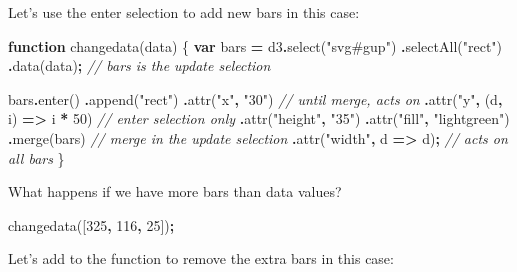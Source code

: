\documentclass[
  openany]{book}
\newenvironment{Shaded}{\begin{snugshade}}{\end{snugshade}}
\newcommand{\CommentTok}[1]{\textcolor[rgb]{0.56,0.35,0.01}{\textit{#1}}}
\newcommand{\DecValTok}[1]{\textcolor[rgb]{0.00,0.00,0.81}{#1}}
\newcommand{\FunctionTok}[1]{\textcolor[rgb]{0.00,0.00,0.00}{#1}}
\newcommand{\KeywordTok}[1]{\textcolor[rgb]{0.13,0.29,0.53}{\textbf{#1}}}
\newcommand{\NormalTok}[1]{#1}
\newcommand{\OperatorTok}[1]{\textcolor[rgb]{0.81,0.36,0.00}{\textbf{#1}}}
\newcommand{\StringTok}[1]{\textcolor[rgb]{0.31,0.60,0.02}{#1}}
\begin{document}
Let's use the enter selection to add new bars in this case:

\begin{Shaded}
\begin{Highlighting}[]
\KeywordTok{function} \FunctionTok{changedata}\NormalTok{(data) \{}
  \KeywordTok{var}\NormalTok{ bars }\OperatorTok{=}\NormalTok{ d3}\OperatorTok{.}\FunctionTok{select}\NormalTok{(}\StringTok{"svg\#gup"}\NormalTok{) }
    \OperatorTok{.}\FunctionTok{selectAll}\NormalTok{(}\StringTok{"rect"}\NormalTok{)}
    \OperatorTok{.}\FunctionTok{data}\NormalTok{(data)}\OperatorTok{;}    \CommentTok{// bars is the update selection}
    
\NormalTok{  bars}\OperatorTok{.}\FunctionTok{enter}\NormalTok{()}
    \OperatorTok{.}\FunctionTok{append}\NormalTok{(}\StringTok{"rect"}\NormalTok{)}
      \OperatorTok{.}\FunctionTok{attr}\NormalTok{(}\StringTok{"x"}\OperatorTok{,} \StringTok{"30"}\NormalTok{)  }\CommentTok{// until merge, acts on}
      \OperatorTok{.}\FunctionTok{attr}\NormalTok{(}\StringTok{"y"}\OperatorTok{,}\NormalTok{ (d}\OperatorTok{,}\NormalTok{ i) }\KeywordTok{=\textgreater{}}\NormalTok{ i }\OperatorTok{*} \DecValTok{50}\NormalTok{) }\CommentTok{// enter selection only}
      \OperatorTok{.}\FunctionTok{attr}\NormalTok{(}\StringTok{"height"}\OperatorTok{,} \StringTok{"35"}\NormalTok{)  }
      \OperatorTok{.}\FunctionTok{attr}\NormalTok{(}\StringTok{"fill"}\OperatorTok{,} \StringTok{"lightgreen"}\NormalTok{)}
    \OperatorTok{.}\FunctionTok{merge}\NormalTok{(bars) }\CommentTok{// merge in the update selection}
      \OperatorTok{.}\FunctionTok{attr}\NormalTok{(}\StringTok{"width"}\OperatorTok{,}\NormalTok{ d }\KeywordTok{=\textgreater{}}\NormalTok{ d)}\OperatorTok{;} \CommentTok{// acts on all bars}
\NormalTok{  \}}
\end{Highlighting}
\end{Shaded}

What happens if we have more bars than data values?

\begin{Shaded}
\begin{Highlighting}[]
\NormalTok{changedata([}\DecValTok{325}\OperatorTok{,} \DecValTok{116}\OperatorTok{,} \DecValTok{25}\NormalTok{])}\OperatorTok{;}
\end{Highlighting}
\end{Shaded}

Let's add to the function to remove the extra bars in this case:
\end{document}
